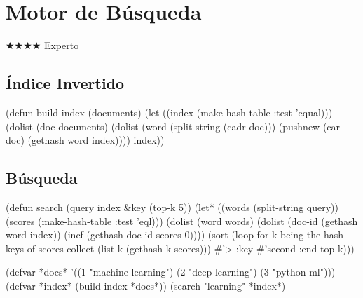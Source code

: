 \chapter{Motor de Búsqueda}
\label{chap:search-engine}
{\huge$\bigstar$}{\huge$\bigstar$}{\huge$\bigstar$}{\huge$\bigstar$} Experto

\section{Índice Invertido}
\begin{lispcode}
(defun build-index (documents)
  (let ((index (make-hash-table :test 'equal)))
    (dolist (doc documents)
      (dolist (word (split-string (cadr doc)))
        (pushnew (car doc) (gethash word index))))
    index))
\end{lispcode}

\section{Búsqueda}
\begin{lispcode}
(defun search (query index &key (top-k 5))
  (let* ((words (split-string query))
         (scores (make-hash-table :test 'eql)))
    (dolist (word words)
      (dolist (doc-id (gethash word index))
        (incf (gethash doc-id scores 0))))
    (sort (loop for k being the hash-keys of scores
                collect (list k (gethash k scores)))
          #'> :key #'second :end top-k)))
\end{lispcode}

\begin{examplebox}[title=Ejemmplo]
\begin{lispcode}
(defvar *docs* '((1 "machine learning") (2 "deep learning") (3 "python ml")))
(defvar *index* (build-index *docs*))
(search "learning" *index*)
\end{lispcode}
\end{examplebox}

